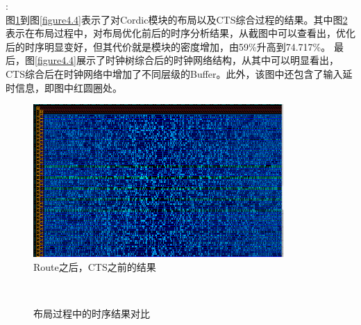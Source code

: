 \documentclass[a4paper,12pt]{report}
\begin{document}
:\\
\indent 图\ref{figure4.2}到图\ref{figure4.4}表示了对Cordic模块的布局以及CTS综合过程的结果。其中图\ref{figure4.3}表示在布局过程中，对布局优化前后的时序分析结果，从截图中可以查看出，优化后的时序明显变好，但其代价就是模块的密度增加，由59\%升高到74.717\%。
最后，图\ref{figure4.4}展示了时钟树综合后的时钟网络结构，从其中可以明显看出，CTS综合后在时钟网络中增加了不同层级的Buffer。此外，该图中还包含了输入延时信息，即图中红圆圈处。

\begin{figure}[!hbtp]
\centering
\includegraphics[width=0.85\textwidth]{CTS1}
\caption{Route之后，CTS之前的结果}
\label{figure4.2}
\end{figure}

\begin{figure}[!hbtp]
\centering
{}
\\
\caption{布局过程中的时序结果对比}
\label{figure4.3}
\end{figure}
\end{document}
